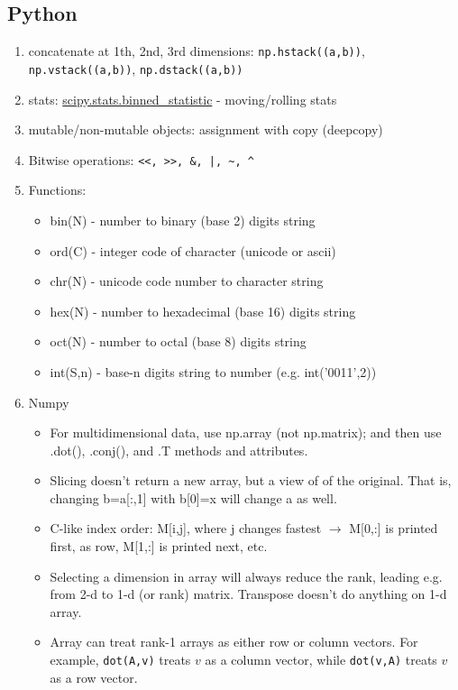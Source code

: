 \documentclass[10pt]{article}
\def\c#1{{\small #1}}
\def\c#1{{\small\verb|#1|}}
\def\c#1{{\small\texttt{#1}}}
\def\np#1{{\small\tt np.#1}}
\begin{document}
\subsection*{Python}
\begin{enumerate}
\item concatenate at 1th, 2nd, 3rd dimensions: \np{hstack((a,b))},
  \np{vstack((a,b))}, \np{dstack((a,b))}
\item stats: \url{scipy.stats.binned_statistic} - moving/rolling stats
\item mutable/non-mutable objects: assignment with copy (deepcopy)
\item Bitwise operations: \verb.<<, >>, &, |, ~, ^.
\item Functions:
  \begin{itemize}
  \item bin(N) - number to binary (base 2) digits string
  \item ord(C) - integer code of character (unicode or ascii)
  \item chr(N) - unicode code number to character string
  \item hex(N) - number to hexadecimal (base 16) digits string
  \item oct(N) - number to octal (base 8) digits string
  \item int(S,n) - base-n digits string to number (e.g. int('0011',2))
  \end{itemize}
\item Numpy
  \begin{itemize}
  \item For multidimensional data, use np.array (not np.matrix); and
    then use .dot(), .conj(), and  .T methods and attributes.
  \item Slicing doesn't return a new array, but a view of of the
    original. That is, changing b=a[:,1] with b[0]=x will change a as well.
  \item C-like index order: M[i,j], where j changes fastest $\to$
    M[0,:] is printed first, as row, M[1,:] is printed next, etc.
  \item Selecting a dimension in array will always reduce the rank,
    leading e.g. from 2-d to 1-d (or rank) matrix. Transpose doesn't
    do anything on 1-d array.
  \item Array can treat rank-1 arrays as either row or column
    vectors. For example, \verb|dot(A,v)| treats $v$ as a column
    vector,
    while \verb|dot(v,A)| treats $v$ as a row vector.\\

\end{itemize}
\end{enumerate}
\end{document}
